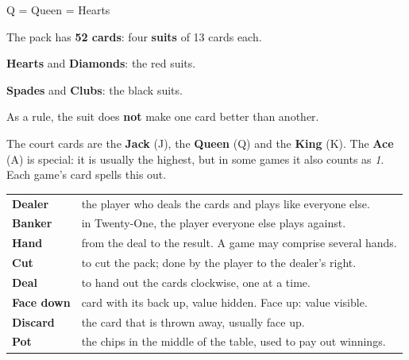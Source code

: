 \documentclass[10pt]{article}
\begin{document}
\startpage
{}
\divider
\begin{minipage}[c]{34mm}\centering
 \par\vspace{1.5mm}
 {\footnotesize Q = Queen\quad\sH{} = Hearts}
\end{minipage}\hfill
\begin{minipage}[c]{82mm}\raggedright
 The pack has \textbf{52 cards}: four \textbf{suits} of 13 cards each.\par\medskip
 \sH{} \textbf{Hearts} and \sD{} \textbf{Diamonds}: the red suits.\par
 \sS{} \textbf{Spades} and \sC{} \textbf{Clubs}: the black suits.\par\medskip
As a rule, the suit does \textbf{not} make one card better than another.
\end{minipage}
\begin{center}
\end{center}
The court cards are the \textbf{Jack} (J), the \textbf{Queen} (Q) and the \textbf{King} (K). The \textbf{Ace} (A) is special: it is usually the highest, but in some games it also counts as \emph{1}. Each game’s card spells this out.

\begingroup\renewcommand{\arraystretch}{1.2}
\begin{tabularx}{\linewidth}{@{}>{\bfseries}p{23mm}>{\raggedright\arraybackslash}X@{}}
 Dealer & the player who deals the cards and plays like everyone else.\\
 Banker & in Twenty-One, the player everyone else plays against.\\
 Hand & from the deal to the result. A game may comprise several hands.\\
 Cut & to cut the pack; done by the player to the dealer’s right.\\
 Deal & to hand out the cards clockwise, one at a time.\\
 Face down & card with its back up, value hidden. Face up: value visible.\\
 Discard & the card that is thrown away, usually face up.\\
 Pot & the chips in the middle of the table, used to pay out winnings.\\
\end{tabularx}\endgroup
\vfill
{}
\end{document}
